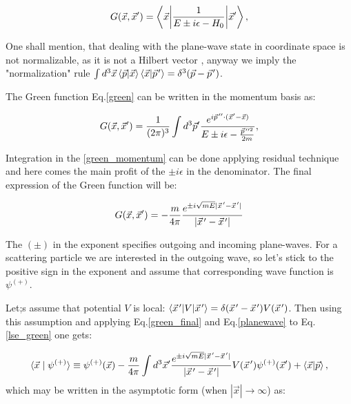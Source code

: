     \begin{equation}
        G(\vec{x}, \vec{x}^\prime) = \mel**{\vec{x}}{\frac{1}{E \pm i\epsilon - H_0}}{\vec{x}^\prime},
        \label{green}
    \end{equation}

    One shall mention, that dealing with the plane-wave state in coordinate space 
    is not normalizable, as it is not a Hilbert vector \cite{Sakurai}, anyway we
    imply the "normalization" rule
    $\int d^3\vec{x} \braket{\vec{p}}{\vec{x}} \braket{\vec{x}}{\pvec{p}} = \delta^3(\vec{p} - \pvec{p})$.


    The Green function Eq.\ref{green} can be written in the momentum basis as:

    \begin{equation}
        G(\vec{x}, \vec{x}^\prime) = \frac{1}{(2\pi)^3} \int d^3 \vec{p}^\prime
        \frac{e^{i\pvec{p}'\cdot(\vec{x}'-\vec{x})}}{E \pm i\epsilon - \frac{\pvec{p}^{\prime 2}}{2m}},
        \label{green_momentum}
    \end{equation}


    Integration in the \ref*{green_momentum} can be done applying residual technique and here comes
    the main profit of the $\pm i\epsilon$ in the denominator.
    The final expression of the Green function will be:

    \begin{equation}
        G(\vec{x}, \vec{x}^\prime) = - \frac{m}{4\pi} \frac{e^{\pm i\sqrt{mE}|\pvec{x} -\pvec{x} |}}{|\pvec{x} -\pvec{x} |}
        \label{green_final}
    \end{equation}

    The $(\pm)$ in the exponent specifies outgoing and incoming plane-waves. For a scattering
    particle we are interested in the outgoing wave, so let's stick to the positive sign in the exponent
    and assume that corresponding wave function is $\psi^{(+)}$. 

    Let;s assume that potential $V$ is local: $\mel**{\pvec{x}}{V}{\pvec{x}} = \delta(\pvec{x} - \pvec{x})V(\pvec{x})$. 
    Then using this assumption and applying Eq.\ref{green_final} and 
    Eq.\ref{planewave} to Eq.\ref*{lse_green} one gets:

    \begin{equation}
        \langle \vec{x}  \mid \psi^{(+)} \rangle \equiv \psi^{(+)}(\vec{x}) 
        - \frac{m}{4\pi} \int d^3 \vec{x}^\prime \frac{e^{\pm i\sqrt{mE}|\pvec{x} -\pvec{x} |}}{|\pvec{x} -\pvec{x} |} 
        V(\pvec{x}) \psi^{(+)}(\vec{x}^\prime) + \braket{\vec{x}}{\vec{p}},
        \label{lse_green_explicit}
    \end{equation}
    which may be written in the asymptotic form (when $|\vec{x}| \rightarrow \infty$) as:

